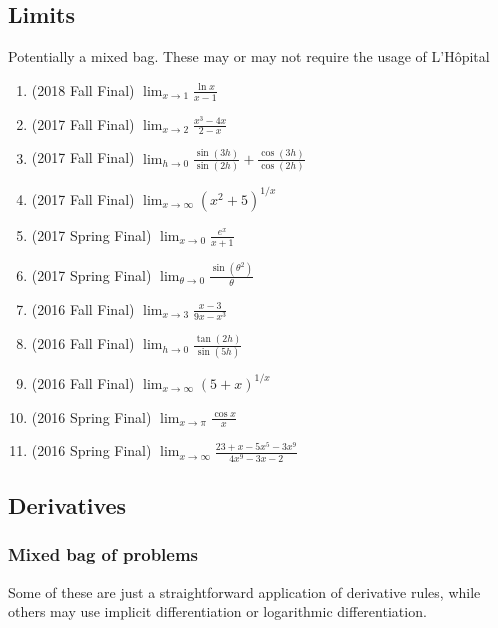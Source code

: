 \documentclass[10pt]{scrartcl}
\begin{document}
\subsection{Limits}
Potentially a mixed bag. These may or may not require the usage of L'H\^{o}pital
\begin{enumerate}
\item (2018 Fall Final) $\lim_{x\to1} \frac{\ln x}{x-1}$
\item (2017 Fall Final) $\lim_{x\to2} \frac{x^3 - 4x}{2-x}$
\item (2017 Fall Final) $\lim_{h\to 0} \frac{\sin(3h)}{\sin(2h)} + \frac{\cos(3h)}{\cos(2h)}$
\item (2017 Fall Final) $\lim_{x\to\infty} (x^2+5)^{1/x}$
\item (2017 Spring Final) $\lim_{x\to0} \frac{e^x}{x+1}$
\item (2017 Spring Final) $\lim_{\theta\to0} \frac{\sin(\theta^2)}{\theta}$
\item (2016 Fall Final) $\lim_{x\to 3} \frac{x-3}{9x-x^3}$
\item (2016 Fall Final) $\lim_{h\to 0}\frac{\tan(2h)}{\sin(5h)}$
\item (2016 Fall Final) $\lim_{x\to\infty} (5+x)^{1/x}$
\item (2016 Spring Final) $\lim_{x\to\pi} \frac{\cos x}{x}$
\item (2016 Spring Final) $\lim_{x\to\infty} \frac{23 + x - 5x^5 - 3x^9}{4x^9 - 3x - 2}$
\end{enumerate}

\subsection{Derivatives}
\subsubsection{Mixed bag of problems}
Some of these are just a straightforward application of derivative rules, while others may use implicit differentiation or logarithmic differentiation.
\end{document}
